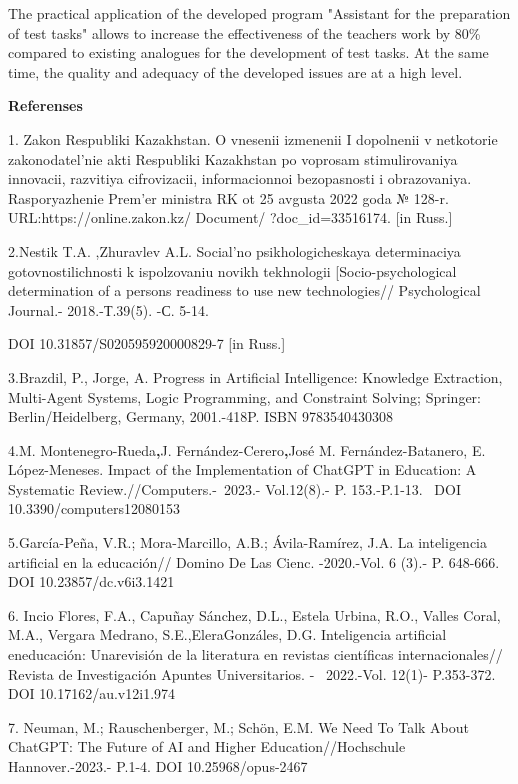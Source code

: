 The practical application of the developed program "Assistant for the
preparation of test tasks" allows to increase the effectiveness of the
teacher\textquotesingle s work by 80\% compared to existing analogues
for the development of test tasks. At the same time, the quality and
adequacy of the developed issues are at a high level.

{\bfseries Referenses}

1. Zakon Respubliki Kazakhstan. O vnesenii izmenenii I dopolnenii v
netkotorie zakonodatel'nie akti Respubliki Kazakhstan po voprosam
stimulirovaniya innovacii, razvitiya cifrovizacii, informacionnoi
bezopasnosti i obrazovaniya. Rasporyazhenie Prem'er ministra RK ot 25
avgusta 2022 goda № 128-r. URL:https://online.zakon.kz/ Document/
?doc\_id=33516174. {[}in Russ.{]}

2.Nestik T.A. ,Zhuravlev A.L. Social'no psikhologicheskaya determinaciya
gotovnostilichnosti k ispolzovaniu novikh tekhnologii
{[}Socio-psychological determination of a person\textquotesingle s
readiness to use new technologies// Psychological Journal.-
2018.-Т.39(5). -С. 5-14.

DOI 10.31857/S020595920000829-7 {[}in Russ.{]}

3.Brazdil, P., Jorge, A. Progress in Artificial Intelligence: Knowledge
Extraction, Multi-Agent Systems, Logic Programming, and Constraint
Solving; Springer: Berlin/Heidelberg, Germany, 2001.-418P. ISBN
9783540430308

4.M. Montenegro-Rueda{\bfseries ,}J. Fernández-Cerero{\bfseries ,}José M.
Fernández-Batanero, E. López-Meneses. Impact of the Implementation of
ChatGPT in Education: A Systematic Review.//Computers.-\emph{~}2023.-
Vol.12(8).- P. 153.-P.1-13. ~DOI 10.3390/computers12080153

5.García-Peña, V.R.; Mora-Marcillo, A.B.; Ávila-Ramírez, J.A. La
inteligencia artificial en la educación// Domino De Las Cienc.
-2020.-Vol. 6 (3).- P. 648-666. DOI 10.23857/dc.v6i3.1421

6. Incio Flores, F.A., Capuñay Sánchez, D.L., Estela Urbina, R.O.,
Valles Coral, M.A., Vergara Medrano, S.E.,EleraGonzáles, D.G.
Inteligencia artificial eneducación: Unarevisión de la literatura en
revistas científicas internacionales// Revista de Investigación Apuntes
Universitarios. - ~2022.-Vol. 12(1)- P.353-372. DOI
10.17162/au.v12i1.974

7. Neuman, M.; Rauschenberger, M.; Schön, E.M. We Need To Talk About
ChatGPT: The Future of AI and Higher Education//Hochschule
Hannover.-2023.- P.1-4. DOI 10.25968/opus-2467

